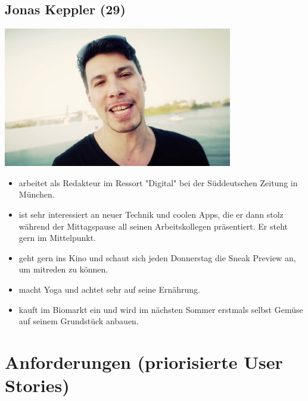 \documentclass[10pt, a4paper, oneside, titlepage]{scrartcl} %
\begin{document}
	\subsection{Jonas Keppler (29)}
	\begin{center}
		\includegraphics[width=10.0cm]{persona_03.jpg}
	\end{center}
	\begin{itemize}
		\item{}arbeitet als Redakteur im Ressort "Digital" bei der Süddeutschen Zeitung in München.
		\item{}ist sehr interessiert an neuer Technik und coolen Apps, die er dann stolz während der Mittagspause all seinen Arbeitskollegen präsentiert. Er 				steht gern im Mittelpunkt.
		\item{}geht gern ins Kino und schaut sich jeden Donnerstag die Sneak Preview an, um mitreden zu können.
		\item{}macht Yoga und achtet sehr auf seine Ernährung.
		\item{}kauft im Biomarkt ein und wird im nächsten Sommer erstmals selbst Gemüse auf seinem Grundstück anbauen.
	\end{itemize}
	
   	\section{Anforderungen (priorisierte User Stories)}
	
\end{document}
